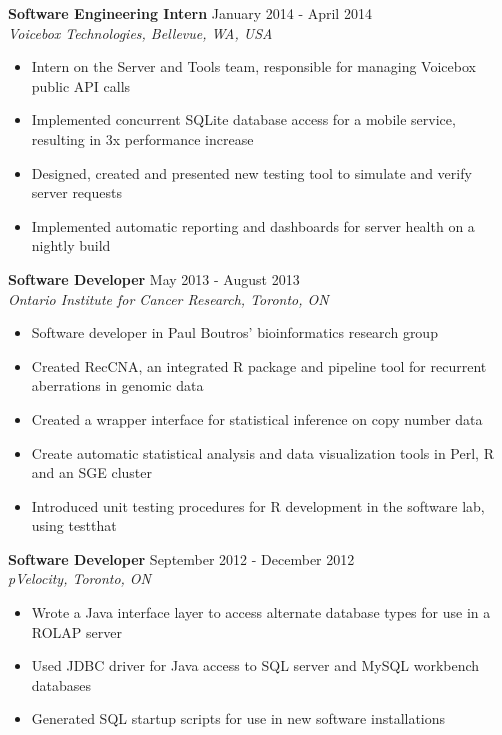 \documentclass[10pt]{res} %
\begin{document}
\begin{resume}
\textbf{Software Engineering Intern} \hfill January 2014 - April 2014 \\[2pt]
{\sl Voicebox Technologies, Bellevue, WA, USA} 
\begin{itemize}  %
    \item Intern on the Server and Tools team, responsible for managing Voicebox public API calls
    \item Implemented concurrent SQLite database access for a mobile service, resulting in 3x performance increase
    \item Designed, created and presented new testing tool to simulate and verify server requests
    \item Implemented automatic reporting and dashboards for server health on a nightly build
\end{itemize}

\textbf{Software Developer} \hfill May 2013 - August 2013 \\[2pt]
{\sl Ontario Institute for Cancer Research, Toronto, ON} 
\begin{itemize}  %
    \item Software developer in Paul Boutros' bioinformatics research group
    \item Created RecCNA, an integrated R package and pipeline tool for recurrent aberrations in genomic data
    \item Created a wrapper interface for statistical inference on copy number data
    \item Create automatic statistical analysis and data visualization tools in Perl, R and an SGE cluster
    \item Introduced unit testing procedures for R development in the software lab, using testthat
\end{itemize}

\textbf{Software Developer} \hfill September 2012 - December 2012 \\[2pt]
{\sl pVelocity, Toronto, ON} 
\begin{itemize}  %
    \item Wrote a Java interface layer to access alternate database types for use in a ROLAP server
    \item Used JDBC driver for Java access to SQL server and MySQL workbench databases
    \item Generated SQL startup scripts for use in new software installations
\end{itemize}


\end{resume}
\end{document}
